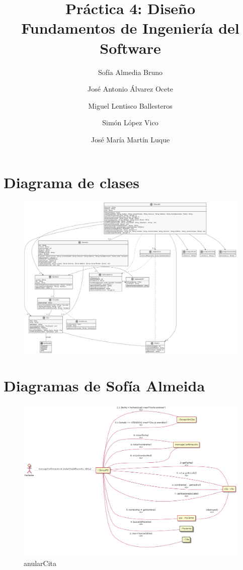 \documentclass[11pt,a4paper]{article}
\title{Práctica 4: Diseño \large\\ Fundamentos de Ingeniería del Software}
\author{Sofía Almedia Bruno \and José Antonio Álvarez Ocete \and Miguel Lentisco Ballesteros \and Simón López Vico \and José María Martín Luque}
\begin{document}
\maketitle

\section{Diagrama de clases}

\begin{figure}[H]
	\centering
	\includegraphics[width=\textwidth,height=\textheight,keepaspectratio]{Diagramas/diagramaClases}
\end{figure}

\section{Diagramas de Sofía Almeida}

\begin{figure}[H]
	\caption{anularCita}
	\centering
	\includegraphics[width=\textwidth,height=\textheight,keepaspectratio]{Diagramas/anularcita}
\end{figure}
\end{document}

